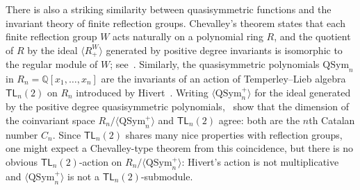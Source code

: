 \documentclass[12pt]{amsart}
\theoremstyle{definition}
\theoremstyle{remark}
\numberwithin{equation}{section}
\newcommand{\QQ}{\mathbb{Q}}
\newcommand{\TL}{\mathsf{TL}}
\newcommand{\QSym}{\mathrm{QSym}}
\begin{document}
There is also a striking similarity between quasisymmetric functions and the invariant theory of finite reflection groups.  
Chevalley's theorem states that each finite reflection group $W$ acts naturally on a polynomial ring $R$, and the quotient of $R$ by the ideal $\langle R_{+}^{W} \rangle$ generated by positive degree invariants is isomorphic to the regular module of $W$; see~\cite[Chapter 3]{Humphrey}.  
Similarly, the quasisymmetric polynomials $\QSym_{n}$ in $R_{n} = \QQ[x_{1}, \ldots, x_{n}]$ are the invariants of an action of  Temperley--Lieb algebra $\TL_{n}(2)$ on $R_{n}$  introduced by Hivert~\cite{Hivert}.  
Writing $\langle \QSym_{n}^{+} \rangle$
for the ideal generated by the positive degree quasisymmetric polynomials,~\cite{AB,ABB} show that the dimension of the coinvariant space $R_{n}\big/\langle \QSym_{n}^{+} \rangle$ and $\TL_{n}(2)$ agree: both are the $n$th Catalan number $C_{n}$.  
Since $\TL_{n}(2)$ shares many nice properties with reflection groups, one might expect a Chevalley-type theorem from this coincidence, but there is no obvious $\TL_{n}(2)$-action on $R_{n}\big/\langle \QSym_{n}^{+} \rangle$:  Hivert's action is not multiplicative and $\langle \QSym_{n}^{+} \rangle$ is not a $\TL_{n}(2)$-submodule.  
\end{document}
